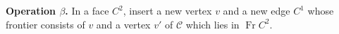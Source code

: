 \textbf{Operation $\beta$.} In a face $C^2$, insert a new vertex $v$ and a new edge $C^1$ whose frontier consists of $v$ and a vertex $v'$ of $\mathcal{C}$ which lies in $\operatorname{Fr} C^2$.
